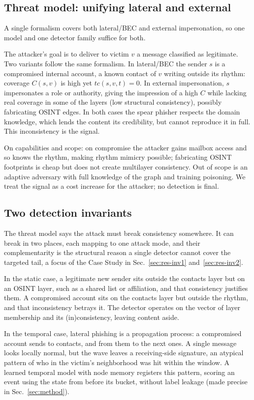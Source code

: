 \subsection{Threat model: unifying lateral and external}
\label{sec:threat}
A single formalism covers both lateral/BEC and external impersonation, so one model and one detector family
suffice for both.

\smallskip The attacker's goal is to deliver to victim $v$ a message classified as legitimate. Two variants
follow the same formalism. In lateral/BEC the sender $s$ is a compromised internal account, a known contact of
$v$ writing outside its rhythm: coverage $C(s,v)$ is high yet $tc(s,v,t)=0$. In external impersonation, $s$
impersonates a role or authority, giving the impression of a high $C$ while lacking real coverage in some of the
layers (low structural consistency), possibly fabricating OSINT edges. In both cases the spear phisher respects the domain knowledge, which lends the content its credibility, but cannot reproduce it in full. This inconsistency is the signal.

\smallskip On capabilities and scope: on compromise the attacker gains mailbox access and so knows
the rhythm, making rhythm mimicry possible; fabricating OSINT footprints is cheap but does not create multilayer
consistency. Out of scope is an adaptive adversary with full knowledge of the graph and training poisoning. We
treat the signal as a cost increase for the attacker; no detection is final.

\subsection{Two detection invariants}
\label{sec:invariants}
The threat model says the attack must break consistency somewhere. It can break in two places, each mapping
to one attack mode, and their complementarity is the structural reason a single detector cannot cover
the targeted tail, a focus of the Case Study in
Sec.~\ref{sec:res-inv1} and~\ref{sec:res-inv2}.

\smallskip In the static case, a legitimate new sender sits outside the
contacts layer but on an OSINT layer, such as a shared list or affiliation, and that consistency justifies them.
A compromised account sits on the contacts layer but outside the rhythm, and that inconsistency betrays it. The
detector operates on the vector of layer membership and its (in)consistency, leaving content aside.

\smallskip In the temporal case, lateral phishing is a propagation process: a
compromised account sends to contacts, and from them to the next ones. A single message looks locally normal, but
the wave leaves a receiving-side signature, an atypical pattern of who in the victim's neighborhood was hit within
the window. A learned temporal model with node memory registers this pattern, scoring an event using the state from
before its bucket, without label leakage (made precise in Sec.~\ref{sec:method}).

